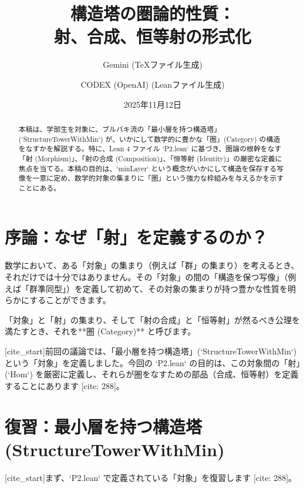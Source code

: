 \documentclass[11pt]{ltjsarticle}
\title{構造塔の圏論的性質：\\
射、合成、恒等射の形式化}
\author{
    Gemini (TeXファイル生成) \and
    CODEX (OpenAI) (Leanファイル生成)
}
\date{2025年11月12日}
\theoremstyle{definition}
\theoremstyle{plain}
\theoremstyle{remark}
\begin{document}
\maketitle

\begin{abstract}
本稿は、学部生を対象に、ブルバキ流の「最小層を持つ構造塔」(`StructureTowerWithMin`) が、いかにして数学的に豊かな「圏」(Category) の構造をなすかを解説する。特に、Lean 4 ファイル `P2.lean` に基づき、圏論の根幹をなす「射 (Morphism)」、「射の合成 (Composition)」、「恒等射 (Identity)」の厳密な定義に焦点を当てる。本稿の目的は、`minLayer` という概念がいかにして構造を保存する写像を一意に定め、数学的対象の集まりに「圏」という強力な枠組みを与えるかを示すことにある。
\end{abstract}

\tableofcontents

\section{序論：なぜ「射」を定義するのか？}

数学において、ある「対象」の集まり（例えば「群」の集まり）を考えるとき、それだけでは十分ではありません。その「対象」の間の「構造を保つ写像」（例えば「群準同型」）を定義して初めて、その対象の集まりが持つ豊かな性質を明らかにすることができます。

「対象」と「射」の集まり、そして「射の合成」と「恒等射」が然るべき公理を満たすとき、それを**圏 (Category)** と呼びます。

[cite_start]前回の議論では、「最小層を持つ構造塔」(`StructureTowerWithMin`) という「対象」を定義しました。今回の `P2.lean` の目的は、この対象間の「射」(`Hom`) を厳密に定義し、それらが圏をなすための部品（合成、恒等射）を定義することにあります [cite: 288]。

\section{復習：最小層を持つ構造塔 (StructureTowerWithMin)}

[cite_start]まず、`P2.lean` で定義されている「対象」を復習します [cite: 288]。
\end{document}
